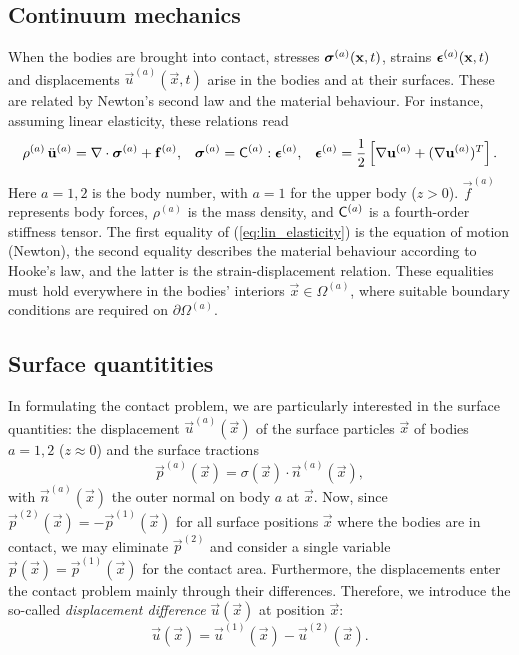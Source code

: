 \documentclass[12pt]{report}
\begin{document}
\subsection{Continuum mechanics}

When the bodies are brought into contact, stresses
$\boldsymbol{\sigma}^{(a)}(\mathbf{x},t)$, strains $\boldsymbol{\epsilon}^{(a)}(\mathbf{x},t)$
and displacements $\vec{u}^{(a)}(\vec{x},t)$ arise in the bodies and at
their surfaces. These are related by Newton's second law and the material
behaviour. For instance, assuming linear elasticity, these relations read
\begin{equation}\label{eq:lin_elasticity}
  \rho^{(a)}\,\ddot{\mathbf{u}}^{(a)} =
                \nabla\cdot\boldsymbol{\sigma}^{(a)} + \mathbf{f}^{(a)}, \;\;\;
  \boldsymbol{\sigma}^{(a)} = {\sf C}^{(a)} : \boldsymbol{\epsilon}^{(a)} , \;\;\;
  \boldsymbol{\epsilon}^{(a)} = \frac{1}{2}\left[ \nabla\mathbf{u}^{(a)} +
                        (\nabla\mathbf{u}^{(a)})^T \right] .
\end{equation}
Here $a=1,2$ is the body number, with $a=1$ for the upper body ($z>0$).
$\vec{f}^{(a)}$ represents body forces, $\rho^{(a)}$ is the mass density, and
${\sf C}^{(a)}$ is a fourth-order stiffness tensor. The first equality of
(\ref{eq:lin_elasticity}) is the equation of motion (Newton),
the second equality describes the material behaviour according to Hooke's
law, and the latter is the strain-displacement relation. These equalities
must hold everywhere in the bodies' interiors $\vec{x}\in\Omega^{(a)}$,
where suitable boundary conditions are required on $\partial\Omega^{(a)}$.

\subsection{Surface quantitities}

In formulating the contact problem, we are particularly interested in the
surface quantities: the displacement $\vec{u}^{(a)}(\vec{x})$ of the
surface particles $\vec{x}$ of bodies $a=1,2$ ($z\approx 0$) and the surface
tractions
\begin{equation}
   \vec{p}^{(a)}(\vec{x}) = \sigma(\vec{x})\cdot\vec{n}^{(a)}(\vec{x}),
\end{equation}
with $\vec{n}^{(a)}(\vec{x})$ the outer normal on body $a$ at $\vec{x}$.
Now, since $\vec{p}^{(2)}(\vec{x})=-\vec{p}^{(1)}(\vec{x})$ for all surface
positions $\vec{x}$ where the bodies are in contact, we may eliminate
$\vec{p}^{(2)}$ and consider a single variable $\vec{p}(\vec{x})=
\vec{p}^{(1)}(\vec{x})$ for the contact area. Furthermore, the
displacements enter the contact problem mainly through their differences.
Therefore, we introduce the so-called {\em displacement difference\/}
$\vec{u}(\vec{x})$ at position $\vec{x}$:
\begin{equation}\label{eq:displ_diff}
   \vec{u}(\vec{x}) = \vec{u}^{(1)}(\vec{x}) -\vec{u}^{(2)}(\vec{x}).
\end{equation}
\end{document}
